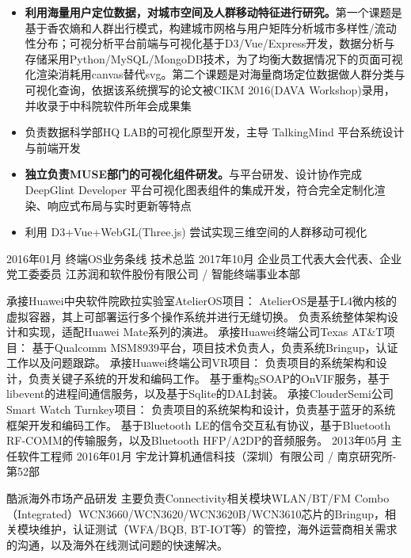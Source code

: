 \documentclass{resume}
\begin{document}
\begin{itemize}
  \item \textbf{利用海量用户定位数据，对城市空间及人群移动特征进行研究。}第一个课题是基于香农熵和人群出行模式，构建城市网格与用户矩阵分析城市多样性/流动性分布；可视分析平台前端与可视化基于D3/Vue/Express开发，数据分析与存储采用Python/MySQL/MongoDB技术，为了均衡大数据情况下的页面可视化渲染消耗用canvas替代svg。第二个课题是对海量商场定位数据做人群分类与可视化查询，依据该系统撰写的论文被CIKM 2016(DAVA Workshop)录用，并收录于中科院软件所年会成果集
  \item 负责数据科学部HQ LAB的可视化原型开发，主导 TalkingMind 平台系统设计与前端开发
\end{itemize}

\begin{itemize}
  \item \textbf{独立负责MUSE部门的可视化组件研发。}与平台研发、设计协作完成 DeepGlint Developer 平台可视化图表组件的集成开发，符合完全定制化渲染、响应式布局与实时更新等特点
  \item 利用 D3+Vue+WebGL(Three.js) 尝试实现三维空间的人群移动可视化
\end{itemize}




2016年01月		终端OS业务条线 技术总监
2017年10月		企业员工代表大会代表、企业党工委委员
江苏润和软件股份有限公司 / 智能终端事业本部

承接Huawei中央软件院欧拉实验室AtelierOS项目：
AtelierOS是基于L4微内核的虚拟容器，其上可部署运行多个操作系统并进行无缝切换。
负责系统整体架构设计和实现，适配Huawei Mate系列的演进。
承接Huawei终端公司Texas AT&T项目：
基于Qualcomm MSM8939平台，项目技术负责人，负责系统Bringup，认证工作以及问题跟踪。
承接Huawei终端公司VR项目：
负责项目的系统架构和设计，负责关键子系统的开发和编码工作。
基于重构gSOAP的OnVIF服务，基于libevent的进程间通信服务，以及基于Sqlite的DAL封装。
承接ClouderSemi公司Smart Watch Turnkey项目：
负责项目的系统架构和设计，负责基于蓝牙的系统框架开发和编码工作。
基于Bluetooth LE的信令交互私有协议，基于Bluetooth RF-COMM的传输服务，以及Bluetooth HFP/A2DP的音频服务。
2013年05月 		主任软件工程师
2016年01月		宇龙计算机通信科技（深圳）有限公司 / 南京研究所-第52部

酷派海外市场产品研发
主要负责Connectivity相关模块WLAN/BT/FM Combo（Integrated）WCN3660/WCN3620/WCN3620B/WCN3610芯片的Bringup，相关模块维护，认证测试（WFA/BQB, BT-IOT等）的管控，海外运营商相关需求的沟通，以及海外在线测试问题的快速解决。
\end{document}
